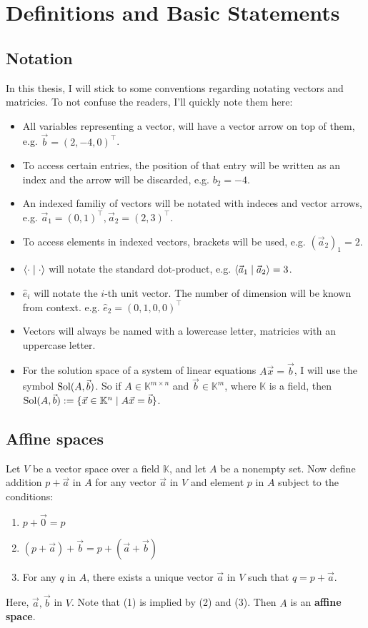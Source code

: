 \section{Definitions and Basic Statements}
\subsection{Notation}
In this thesis, I will stick to some conventions regarding notating vectors and matricies. To not confuse the readers, I'll quickly note them here:
\begin{itemize}
    \item All variables representing a vector, will have a vector arrow on top of them, e.g. $\vec b = (2, -4, 0)^\top$.
    \item To access certain entries, the position of that entry will be written as an index and the arrow will be discarded, e.g. $b_2 = -4$.
    \item An indexed familiy of vectors will be notated with indeces and vector arrows, e.g. $\vec a_1 = (0, 1)^\top, \vec a_2 = (2, 3)^\top$.
    \item To access elements in indexed vectors, brackets will be used, e.g. $(\vec a_2)_1 = 2$.
    \item $\langle \cdot \mid \cdot \rangle$ will notate the standard dot-product, e.g. $\langle \vec a_1 \mid \vec a_2 \rangle = 3$.
    \item $\hat e_i$ will notate the $i$-th unit vector. The number of dimension will be known from context. e.g. $\hat e_2 = (0, 1, 0, 0)^\top$
    \item Vectors will always be named with a lowercase letter, matricies with an uppercase letter.
    \item For the solution space of a system of linear equations $A\vec x = \vec b$, I will use the symbol $\operatorname{Sol}(A, \vec b)$. So if $A\in \mathbb{K}^{m\times n}$ and $\vec b \in \mathbb{K}^m$, where $\mathbb{K}$ is a field, then $ \operatorname{Sol}(A, \vec b) := \{\vec x \in \mathbb{K}^n\mid A\vec x = \vec b\}$.
\end{itemize}
\subsection{Affine spaces}
\begin{definition}
    Let $V$ be a vector space over a field $\mathbb{K}$, and let $A$ be a nonempty set. Now define addition $p+\vec a$ in $A$ for any vector $\vec a$ in $V$ and element $p$ in $A$ subject to the conditions:
    \begin{enumerate}
        \item $p + \vec0 = p$
        \item $(p+\vec a)+\vec b=p+(\vec a+\vec b)$
        \item For any $q$ in $A$, there exists a unique vector $\vec a$ in $V$ such that $q=p+\vec a$.
    \end{enumerate}
    Here, $\vec a, \vec b$ in $V$. Note that (1) is implied by (2) and (3). Then $A$ is an \textbf{affine space}.
\end{definition}

